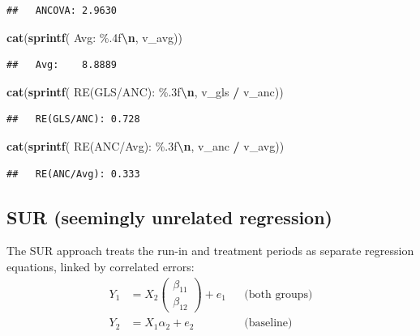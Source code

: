 \documentclass[
  11pt,
]{article}
\newenvironment{Shaded}{\begin{snugshade}}{\end{snugshade}}
\newcommand{\FunctionTok}[1]{\textcolor[rgb]{0.13,0.29,0.53}{\textbf{#1}}}
\newcommand{\NormalTok}[1]{#1}
\newcommand{\SpecialCharTok}[1]{\textcolor[rgb]{0.81,0.36,0.00}{\textbf{#1}}}
\newcommand{\StringTok}[1]{\textcolor[rgb]{0.31,0.60,0.02}{#1}}
\begin{document}
\begin{verbatim}
##   ANCOVA: 2.9630
\end{verbatim}

\begin{Shaded}
\begin{Highlighting}[]
\FunctionTok{cat}\NormalTok{(}\FunctionTok{sprintf}\NormalTok{(}\StringTok{\textquotesingle{}  Avg:    \%.4f}\SpecialCharTok{\textbackslash{}n}\StringTok{\textquotesingle{}}\NormalTok{, v\_avg))}
\end{Highlighting}
\end{Shaded}

\begin{verbatim}
##   Avg:    8.8889
\end{verbatim}

\begin{Shaded}
\begin{Highlighting}[]
\FunctionTok{cat}\NormalTok{(}\FunctionTok{sprintf}\NormalTok{(}\StringTok{\textquotesingle{}  RE(GLS/ANC): \%.3f}\SpecialCharTok{\textbackslash{}n}\StringTok{\textquotesingle{}}\NormalTok{, v\_gls }\SpecialCharTok{/}\NormalTok{ v\_anc))}
\end{Highlighting}
\end{Shaded}

\begin{verbatim}
##   RE(GLS/ANC): 0.728
\end{verbatim}

\begin{Shaded}
\begin{Highlighting}[]
\FunctionTok{cat}\NormalTok{(}\FunctionTok{sprintf}\NormalTok{(}\StringTok{\textquotesingle{}  RE(ANC/Avg): \%.3f}\SpecialCharTok{\textbackslash{}n}\StringTok{\textquotesingle{}}\NormalTok{, v\_anc }\SpecialCharTok{/}\NormalTok{ v\_avg))}
\end{Highlighting}
\end{Shaded}

\begin{verbatim}
##   RE(ANC/Avg): 0.333
\end{verbatim}

\subsection{SUR (seemingly unrelated regression)}\label{sur-seemingly-unrelated-regression}

The SUR approach treats the run-in and treatment
periods as separate regression equations, linked by
correlated errors:
\begin{align}
  Y_1 &= X_2 \begin{pmatrix}
    \beta_{11} \\ \beta_{12}
  \end{pmatrix} + e_1
  & &\text{(both groups)} \\
  Y_2 &= X_1 \alpha_2 + e_2
  & &\text{(baseline)}
\end{align}
\end{document}
